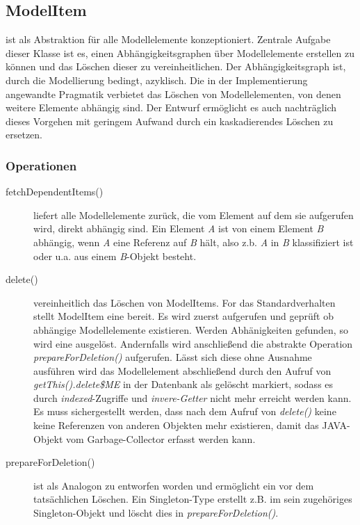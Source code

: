 \subsection{ModelItem}

 ist als Abstraktion für alle Modellelemente konzeptioniert. 
Zentrale Aufgabe dieser Klasse ist es, einen Abhängigkeitsgraphen über Modellelemente erstellen zu können und 
das Löschen dieser zu vereinheitlichen. Der Abhängigkeitsgraph ist, durch die Modellierung bedingt, azyklisch.
Die in der Implementierung angewandte Pragmatik verbietet das Löschen von Modellelementen, von denen weitere Elemente 
abhängig sind. Der Entwurf ermöglicht es auch nachträglich dieses Vorgehen mit geringem Aufwand durch ein kaskadierendes Löschen zu 
ersetzen. 


\subsubsection{Operationen}

\begin{description}
\item[fetchDependentItems()] 
liefert alle Modellelemente zurück, die vom Element auf dem sie aufgerufen wird, direkt abhängig sind.
Ein Element \emph{A} ist von einem Element \emph{B} abhängig, wenn \emph{A} eine Referenz auf \emph{B} hält, also z.b.   
\emph{A} in \emph{B} klassifiziert ist oder u.a. aus einem \emph{B}-Objekt besteht.
 
\item[delete()] vereinheitlich das Löschen von ModelItems. For das Standardverhalten stellt ModelItem eine   
bereit. Es wird zuerst  aufgerufen und geprüft ob abhängige Modellelemente 
existieren. Werden Abhänigkeiten gefunden, so wird eine  ausgelöst. Andernfalls wird anschließend 
die abstrakte Operation \emph{prepareForDeletion()} aufgerufen. Lässt sich diese ohne Ausnahme ausführen wird das Modellelement 
abschließend durch den Aufruf von \emph{getThis().delete\$ME} in der Datenbank als gelöscht markiert, sodass es durch \emph {indexed}-Zugriffe 
und \emph{invere-Getter} nicht mehr erreicht werden kann. Es muss sichergestellt werden, dass nach dem Aufruf von \emph{delete()} keine 
keine Referenzen von anderen Objekten mehr existieren, damit das JAVA-Objekt vom Garbage-Collector erfasst werden kann. 



\item[prepareForDeletion()] ist als Analogon zu  entworfen worden und ermöglicht ein 
 vor dem tatsächlichen Löschen. Ein Singleton-Type erstellt z.B. im  sein zugehöriges 
Singleton-Objekt und löscht dies in \emph{prepareForDeletion()}. 
\end{description}
